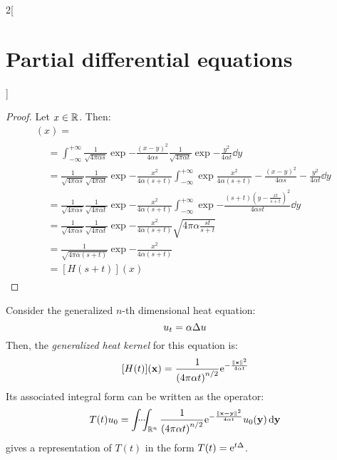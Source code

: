 \documentclass[../../../main_math.tex]{subfiles}
\begin{document}
\begin{multicols}{2}[\section{Partial differential equations}]
  \begin{proof}
    Let $x\in\mathbb{R}$. Then:
    \begin{multline*}
      [H(s)*H(t)](x) =       \\
      \begin{aligned}
         & =\int_{-\infty}^{+\infty}\frac{1}{\sqrt{4\pi\alpha s}}\exp{-\frac{{(x-y)}^2}{4\alpha s}}\frac{1}{\sqrt{4\pi\alpha t}}\exp{-\frac{y^2}{4\alpha t}}\dd{y}                                                    \\
         & =\frac{1}{\sqrt{4\pi\alpha s}}\frac{1}{\sqrt{4\pi\alpha t}}\exp{-\frac{x^2}{4\alpha (s+t)}}\int_{-\infty}^{+\infty}\exp{\frac{x^2}{4\alpha (s+t)}-\frac{{(x-y)}^2}{4\alpha s}-\frac{y^2}{4\alpha t}}\dd{y} \\
         & =\frac{1}{\sqrt{4\pi\alpha s}}\frac{1}{\sqrt{4\pi\alpha t}}\exp{-\frac{x^2}{4\alpha (s+t)}}\int_{-\infty}^{+\infty}\exp{-\frac{(s+t){\left(y-\frac{xt}{s+t}\right)}^2}{4\alpha st}}\dd{y}                  \\
         & =\frac{1}{\sqrt{4\pi\alpha s}}\frac{1}{\sqrt{4\pi\alpha t}}\exp{-\frac{x^2}{4\alpha (s+t)}}\sqrt{4\pi\alpha \frac{st}{s+t}}                                                                                \\
         & =\frac{1}{\sqrt{4\pi\alpha (s+t)}}\exp{-\frac{x^2}{4\alpha (s+t)}}                                                                                                                                         \\
         & = [H(s+t)](x)
      \end{aligned}
    \end{multline*}
  \end{proof}
  \begin{proposition}
    Consider the generalized $n$-th dimensional heat equation:
    \begin{equation}
      u_t=\alpha\Delta u
    \end{equation} Then, the \emph{generalized heat kernel} for this equation is: $$[H(t)](\boldsymbol{\mathrm{x}}) = \frac{1}{{(4\pi\alpha t)}^{n/2}}\mathrm{e}^{-\frac{\left\|\boldsymbol{\mathrm{x}}\right\|^2}{4\alpha t}}$$ Its associated integral form can be written as the operator:
    \begin{equation}\label{PDE:Toperator}
      T(t)u_0=\idotsint_{\mathbb{R}^n}\frac{1}{{(4\pi\alpha t)}^{n/2}}\mathrm{e}^{-\frac{\left\|\boldsymbol{\mathrm{x-y}}\right\|^2}{4\alpha t}}u_0(\boldsymbol{\mathrm{y}})\dd{\boldsymbol{\mathrm{y}}}
    \end{equation}
     gives a representation of $T(t)$ in the form $T(t)=\mathrm{e}^{t\Delta}$.

\end{proposition}
\end{multicols}
\end{document}
